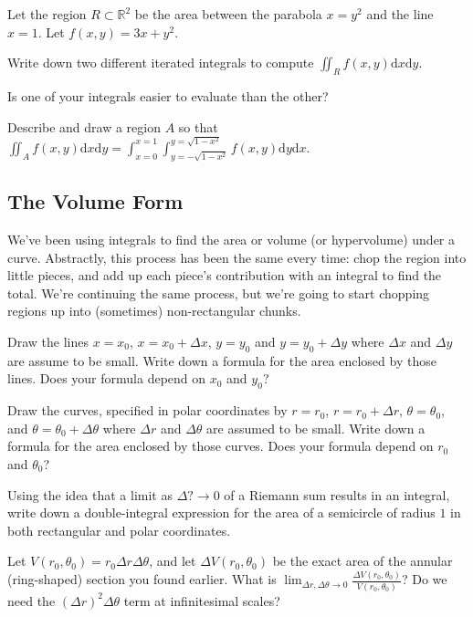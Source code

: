 \documentclass{problemset}
\newcommand{\R}{\mathbb{R}}
\renewcommand{\d}{\mathrm{d}}
\begin{document}
	\question
	Let the region $R\subset \R^2$ be the area between the parabola $x=y^2$ and the line $x=1$.  Let 
	$f(x,y)=3x+y^2$.
	\begin{parts}
		\item Write down two different iterated integrals to compute $\displaystyle \iint_R f(x,y)\d x\d y$.
		\item Is one of your integrals easier to evaluate than the other?
		\item Describe and draw a region $A$ so that 
			$\displaystyle\iint_A f(x,y)\d x\d y = \int_{x=0}^{x=1}\int_{y=-\sqrt{1-x^2}}^{y=\sqrt{1-x^2}} f(x,y)\d y\d x$.
	\end{parts}

\subsection*{The Volume Form}
	We've been using integrals to find the area or volume (or hypervolume) under a curve.
	Abstractly, this process has been the same every time: chop the region into little pieces, and
	add up each piece's contribution with an integral to find the total.  We're continuing the same
	process, but we're going to start chopping regions up into (sometimes) non-rectangular chunks.

	\question
	\begin{parts}
		\item Draw the lines $x=x_0$, $x=x_0+\Delta x$, $y=y_0$ and $y=y_0+\Delta y$ where
			$\Delta x$ and $\Delta y$ are assume to be small.  Write down a formula for the area enclosed by
			those lines.  Does your formula depend on $x_0$ and $y_0$?
		\item Draw the curves, specified in polar coordinates by $r=r_0$, $r=r_0+\Delta r$, $\theta = \theta_0$,
			and $\theta = \theta_0+\Delta\theta$ where $\Delta r$ and $\Delta \theta$ are assumed to
			be small.  Write down a formula for the area enclosed by those curves.  Does your
			formula depend on $r_0$ and $\theta_0$?
		\item Using the idea that a limit as $\Delta ?\to 0$ of a Riemann sum results in an integral, 
			write down a double-integral expression for the area of a semicircle of radius $1$
			in both rectangular and polar coordinates.
		\item Let $V(r_0,\theta_0) = r_0\Delta r\Delta\theta$, and let $\Delta V(r_0,\theta_0)$ be the exact
			area of the annular (ring-shaped) section you found earlier.  What is $\displaystyle \lim_{\Delta r, \Delta\theta\to 0}
			\frac{\Delta V(r_0,\theta_0)}{V(r_0,\theta_0)}$?  Do we need the $(\Delta r)^2\Delta \theta$ term
			at infinitesimal scales?
	\end{parts}
\end{document}

